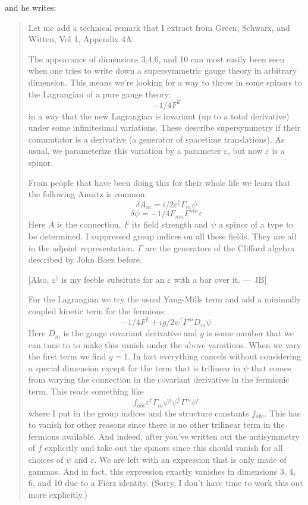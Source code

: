 \documentclass{article}
\begin{document}
and he writes:

\begin{quote}
Let me add a technical remark that I extract from Green, Schwarz, and
Witten, Vol 1, Appendix 4A.

The appearance of dimensions 3,4,6, and 10 can most easily been seen
when one tries to write down a supersymmetric gauge theory in arbitrary
dimension. This means we're looking for a way to throw in some spinors
to the Lagrangian of a pure gauge theory: \[-1/4 F^2\] in a way that the
new Lagrangian is invariant (up to a total derivative) under some
infinitesimal variations. These describe supersymmetry if their
commutator is a derivative (a generator of spacetime translations). As
usual, we parameterize this variation by a parameter \(\varepsilon\),
but now \(\varepsilon\) is a spinor.

From people that have been doing this for their whole life we learn that
the following Ansatz is common:
\[\delta A_m = i/2 \varepsilon^\dagger \Gamma_m \psi\]
\[\delta \psi = -1/4 F_{mn} \Gamma^{mn} \varepsilon\] Here \(A\) is the
connection, \(F\) its field strength and \(\psi\) a spinor of a type to
be determined. I suppressed group indices on all these fields. They are
all in the adjoint representation. \(\Gamma\) are the generators of the
Clifford algebra described by John Baez before.

{[}Also, \(\varepsilon^\dagger\) is my feeble subsitute for an
\(\varepsilon\) with a bar over it. --- JB{]}

For the Lagrangian we try the usual Yang-Mills term and add a minimally
coupled kinetic term for the fermions:
\[-1/4 F^2 + ig/2 \psi^\dagger \Gamma^m D_m \psi\] Here \(D_m\) is the
gauge covariant derivative and \(g\) is some number that we can tune to
to make this vanish under the above variations. When we vary the first
term we find \(g = 1\). In fact everything cancels without considering a
special dimension except for the term that is trilinear in \(\psi\) that
comes from varying the connection in the covariant derivative in the
fermionic term. This reads something like
\[f_{abc} \varepsilon^\dagger \Gamma_m \psi^a \psi^b \Gamma^m \psi^c\]
where I put in the group indices and the structure constants
\(f_{abc}\). This has to vanish for other reasons since there is no
other trilinear term in the fermions available. And indeed, after you've
written out the antisymmetry of \(f\) explicitly and take out the
spinors since this should vanish for all choices of \(\psi\) and
\(\varepsilon\). We are left with an expression that is only made of
gammas. And in fact, this expression exactly vanishes in dimensions 3,
4, 6, and 10 due to a Fierz identity. (Sorry, I don't have time to work
this out more explicitly.)


\end{quote}
\end{document}
